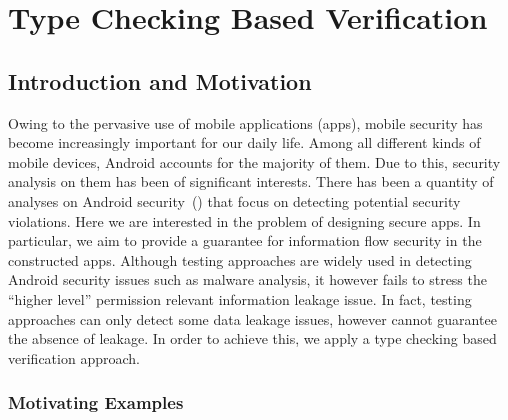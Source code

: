 
\chapter{Type Checking Based Verification} \label{ch:sta}

\section{Introduction and Motivation}\label{sec:sta_intro}

Owing to the pervasive use of mobile applications (apps), mobile security has become increasingly important for our daily life.
Among all different kinds of mobile devices, Android accounts for the majority of them. Due to this, security analysis on them has been of significant interests. There has been a quantity of analyses on Android security~(\cite{Enck:2009:UAS:1512148.1512324, Fuchs2010, Arzt:2014:FPC:2666356.2594299, Wei:2014:APG:2660267.2660357, Li:2015:IDI:2818754.2818791}) that focus on detecting potential security violations. Here we are interested in the problem of designing secure apps.
In particular, we aim to provide a guarantee for information flow security in the constructed apps. Although testing approaches are widely used in detecting Android security issues such as malware analysis, it however fails to stress the ``higher level'' permission relevant information leakage issue. In fact, testing approaches can only detect some data leakage issues, however cannot guarantee the absence of leakage. In order to achieve this, we apply a type checking based verification approach.

\subsection{Motivating Examples}


